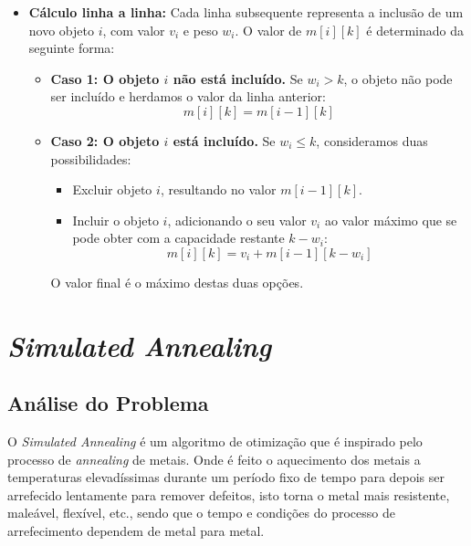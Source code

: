 \begin{itemize}
    \item \textbf{Cálculo linha a linha:}
    Cada linha subsequente representa a inclusão de um novo objeto \( i \), com valor \( v_i \) e peso \( w_i \). O valor de \( m[i][k] \) é determinado da seguinte forma:
    \begin{itemize}
        \item \textbf{Caso 1: O objeto \( i \) não está incluído.}
        Se \( w_i > k \), o objeto não pode ser incluído e herdamos o valor da linha anterior:
        \[
        m[i][k] = m[i-1][k]
        \]
        \item \textbf{Caso 2: O objeto \( i \) está incluído.}
        Se \( w_i \leq k \), consideramos duas possibilidades:
        \begin{itemize}
            \item Excluir objeto \( i \), resultando no valor \( m[i-1][k] \).
            \item Incluir o objeto \( i \), adicionando o seu valor \( v_i \) ao valor máximo que se pode obter com a capacidade restante \( k-w_i \):
            \[
            m[i][k] = v_i + m[i-1][k-w_i]
            \]
        \end{itemize}
        O valor final é o máximo destas duas opções.
    \end{itemize}
\end{itemize}

\section{\textit{Simulated Annealing}}

\subsection{Análise do Problema}

O \textit{Simulated Annealing}\cite{Annealing} é um algoritmo de otimização que é inspirado pelo processo de \textit{annealing} de metais. Onde é feito o aquecimento dos metais a temperaturas elevadíssimas durante um período fixo de tempo para depois ser arrefecido lentamente para remover defeitos, isto torna o metal mais resistente, maleável, flexível, etc., sendo que o tempo e condições do processo de arrefecimento dependem de metal para metal.\cite{annealing2}

